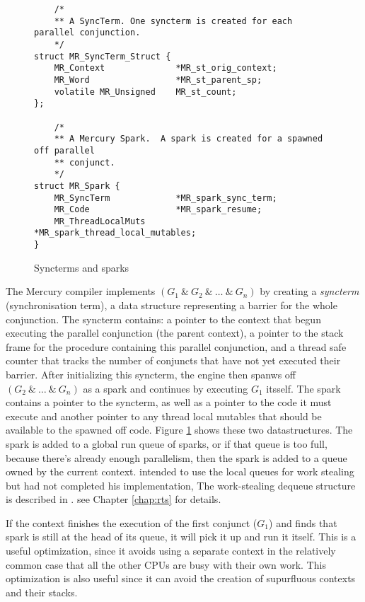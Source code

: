 \begin{figure}
\begin{verbatim}
    /*
    ** A SyncTerm. One syncterm is created for each parallel conjunction.
    */
struct MR_SyncTerm_Struct {
    MR_Context              *MR_st_orig_context;
    MR_Word                 *MR_st_parent_sp;
    volatile MR_Unsigned    MR_st_count;
};

    /*
    ** A Mercury Spark.  A spark is created for a spawned off parallel
    ** conjunct.
    */
struct MR_Spark {
    MR_SyncTerm             *MR_spark_sync_term;
    MR_Code                 *MR_spark_resume;
    MR_ThreadLocalMuts      *MR_spark_thread_local_mutables;
}
\end{verbatim}
\caption{Syncterms and sparks}
\label{fig:spark_and_syncterm}
\end{figure}

The Mercury compiler implements $(G_1~\&~G_2~\&~\ldots~\&~G_n)$
by creating a \emph{syncterm} (synchronisation term), a data structure
representing a barrier for the whole conjunction.
The syncterm contains:
a pointer to the context that begun executing the parallel conjunction
(the parent context),
a pointer to the stack frame for the procedure containing this parallel
conjunction,
and a thread safe counter that tracks the number of conjuncts that have not
yet executed their barrier.
After initializing this syncterm, the engine then
spanws off $(G_2~\&~\ldots~\&~G_n)$ as a spark and continues by executing
$G_1$ itsself.
The spark contains a pointer to the syncterm,
as well as a pointer to the code it must execute
and another pointer to any thread local mutables that should be available to the
spawned off code.
Figure \ref{fig:spark_and_syncterm} shows these two datastructures.
The spark is added to a global run queue of sparks, or if that queue is too
full, because there's already enough parallelism,
then the spark is added to a queue owned by the current context.
\citet{wang_hons_thesis} intended to use the local queues for work stealing
but had not completed his implementation,
The work-stealing dequeue structure
is described in \citet{Chase_2005_wsdeque}.
see Chapter \ref{chap:rts} for details.

If the context finishes the execution of the first conjunct ($G_1$)
and finds that spark is still at the head of its queue,
it will pick it up and run it itself.
This is a useful optimization,
since it avoids using a separate context in the relatively common case
that all the other CPUs are busy with their own work.
This optimization is also useful since it can avoid the creation of supurfluous
contexts and their stacks.

